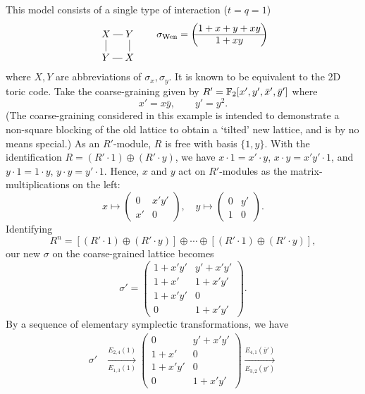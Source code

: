 \begin{example}
\label{eg:wen-plaquette}
This model consists of a single type of interaction ($t=q=1$)
\[
\xymatrix@!0{
X \ar@{-}[r] & Y \ar@{-}[d] \\
Y \ar@{-}[u] & X \ar@{-}[l]
} \quad \quad
\sigma_\text{Wen} = 
\begin{pmatrix}
 1 + x + y + xy \\
\hline
 1 + xy
\end{pmatrix}
\]
where $X,Y$ are abbreviations of $\sigma_x,\sigma_y$.
It is known to be equivalent to the 2D toric code.
Take the coarse-graining given by $R' = \mathbb{F}_2[x',y',\bar x', \bar y']$ where
\[
 x' = x \bar y, \quad \quad y' = y^2 .
\]
(The coarse-graining considered in this example
is intended to demonstrate a non-square blocking of the old lattice
to obtain a `tilted' new lattice, and is by no means special.)
As an $R'$-module, $R$ is free with basis $\{ 1, y \}$.
With the identification $R = (R' \cdot 1) \oplus (R' \cdot y)$,
we have $x \cdot 1 = x' \cdot y$, $x \cdot y = x'y' \cdot 1$,
and $y \cdot 1 = 1 \cdot y$, $y \cdot y = y' \cdot 1$.
Hence, $x$ and $y$ act on $R'$-modules
as the matrix-multiplications on the left:
\[
x \mapsto 
\begin{pmatrix}
0  & x'y'\\
x' &   0
\end{pmatrix},
\quad
y \mapsto
\begin{pmatrix}
0 & y'\\
1 & 0
\end{pmatrix}.
\]
Identifying
\[
 R^n = [ (R' \cdot 1) \oplus (R' \cdot y) ] \oplus \cdots \oplus [(R' \cdot 1) \oplus (R' \cdot y)] ,
\]
our new $\sigma$ on the coarse-grained lattice becomes
\[
 \sigma' =
\begin{pmatrix}
1+x'y' & y'+x'y'\\
1+x'   & 1+x'y'\\
\hline
1+x'y' & 0 \\
0      & 1+x'y'
\end{pmatrix}.
\]
By a sequence of elementary symplectic transformations, we have
\begin{align*}
\sigma'
&
\xrightarrow[E_{1,3}(1)]{E_{2,4}(1)}
%
\begin{pmatrix}
0      & y'+x'y' \\
1+x'   & 0       \\
1+x'y' & 0       \\
0      & 1+x'y'
\end{pmatrix} 
%
\xrightarrow[E_{3,2}(y')]{E_{4,1}(\bar y')}

\end{align*}
\end{example}
